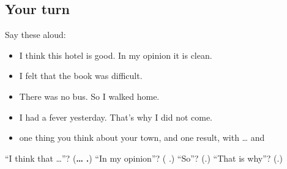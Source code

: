 \subsection*{Your turn}
Say these aloud:

\begin{itemize}
\raggedright
  \item I think this hotel is good. In my opinion it is clean.
  \item I felt that the book was difficult.
  \item There was no bus. So I walked home.
  \item I had a fever yesterday. That's why I did not come.
  \item one thing you think about your town, and one result, with …    and 
\end{itemize}

\begin{tcolorbox}[breakable,colback=teal!4,colframe=teal!35!black,title={Before you move on}]
\textquotedblleft{}I think that …\textquotedblright{}? (\textbf{… }  \textbf{.}) \textquotedblleft{}In my opinion\textquotedblright{}? (\textbf{ }.) \textquotedblleft{}So\textquotedblright{}? (\textbf{}.) \textquotedblleft{}That is why\textquotedblright{}? (\textbf{}.)
\end{tcolorbox}
